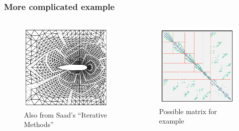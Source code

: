 \documentclass{beamer}
\begin{document}
\begin{frame}
\frametitle{More complicated example}
\begin{columns}
	\begin{column}{0.5\textwidth}
		\begin{figure}
			\centering
			\includegraphics[width=\textwidth]{FIG/Saad_airfoil.png}
			\caption{Also from Saad's ``Iterative Methods''}
		\end{figure}
	\end{column}
	\begin{column}{0.5\textwidth}
		\begin{figure}
			\centering
			\includegraphics[width=\textwidth]{FIG/Saad_cover.png}
			\caption{Possible matrix for example}
		\end{figure}
	\end{column}
\end{columns}
\end{frame}
\end{document}

